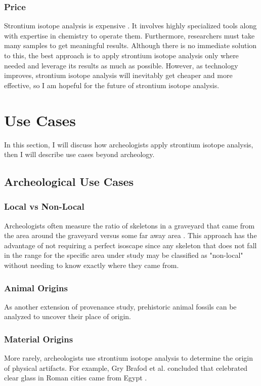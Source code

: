\documentclass[a4paper, 12pt]{article}
\begin{document}
\subsubsection{Price}
Strontium isotope analysis is expensive \citep{holt2021}. It involves highly specialized tools along
with expertise in chemistry to operate them. Furthermore, researchers must take many samples to get
meaningful results. Although there is no immediate solution to this, the best approach
is to apply strontium isotope analysis only where needed and leverage its results
as much as possible. However, as technology improves, strontium
isotope analysis will inevitably get cheaper and more effective, so I am hopeful
for the future of strontium isotope analysis.


\section{Use Cases}
In this section, I will discuss how
archeologists apply strontium isotope analysis, then I will describe use cases beyond archeology.

\subsection{Archeological Use Cases}
\subsubsection{Local vs Non-Local}
Archeologists often measure the ratio of
skeletons in a graveyard that came from the area around the graveyard versus some
far away area \citep{holt2021}. This approach has the advantage of not requiring
a perfect isoscape since any skeleton that does not fall in the range for the specific
area under study may be classified as "non-local" without needing to know exactly where
they came from.

\subsubsection{Animal Origins}
As another extension of provenance study, prehistoric animal fossils can be analyzed
to uncover their place of origin.

\subsubsection{Material Origins}
More rarely, archeologists use strontium isotope analysis to determine the origin
of physical artifacts. For example, Gry Brafod et al. concluded that celebrated
clear glass in Roman cities came from Egypt \citep{barfod2020}.
\end{document}
